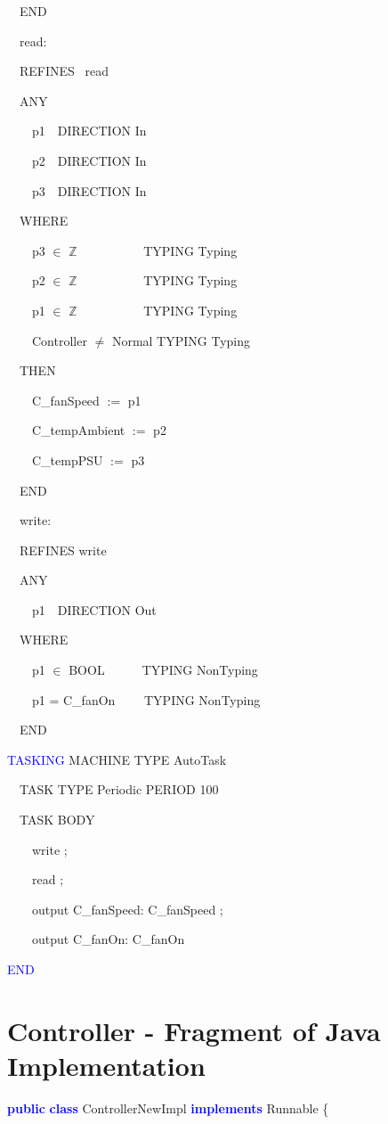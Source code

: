 \documentclass{llncs}%
\begin{document}
\ \ END

\bigskip

\ \ read:\ \  \ 

\ \ REFINES \ read 

\ \ ANY

\ \ \ \ p1\ \  DIRECTION In 

\ \ \ \ p2\ \  DIRECTION In 

\ \ \ \ p3\ \  DIRECTION In 

\ \ WHERE

\ \ \ \ p3 ${\in}$ $\mathbb{Z}$ \ \ \ \ \ \ \ \ \ \  TYPING Typing

\ \ \ \ p2 ${\in}$ $\mathbb{Z}$ \ \ \ \ \ \ \ \ \ \  TYPING Typing

\ \ \ \ p1 ${\in}$ $\mathbb{Z}$ \ \ \ \ \ \ \ \ \ \  TYPING Typing

\ \ \ \ Controller ${\neq}$ Normal TYPING Typing 

\ \ THEN

\ \ \ \ C\_fanSpeed $:=$ p1 

\ \ \ \ C\_tempAmbient $:=$ p2 \ 

\ \ \ \ C\_tempPSU $:=$ p3 

\ \ END

\bigskip

\ \ write:\ \  \ 

\ \ REFINES write 

\ \ ANY

\ \ \ \ p1\ \  DIRECTION Out 

\ \ WHERE

\ \ \ \ p1 ${\in}$ BOOL\ \ \ \ \ \ TYPING NonTyping 

\ \ \ \ p1 = C\_fanOn \ \ \ \ TYPING NonTyping 

\ \ END

\bigskip

\textcolor{blue}{TASKING} MACHINE TYPE AutoTask \ 

\ \ TASK TYPE Periodic PERIOD 100 \ 

\ \ TASK BODY

\ \ \ \ write ;

\ \ \ \ read ;

\ \ \ \ output C\_fanSpeed: C\_fanSpeed ;

\ \ \ \ output C\_fanOn: C\_fanOn 

\textcolor{blue}{END}
%
%
%
\section{Controller - Fragment of Java Implementation}\label{ContJava}
{\ttfamily
\textbf{\textcolor{blue}{public}} \textbf{\textcolor{blue}{class}}
ControllerNewImpl \textbf{\textcolor{blue}{implements}} Runnable \{}
\end{document}

